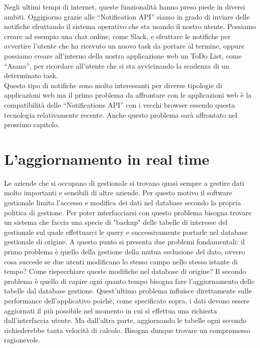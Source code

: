 Negli ultimi tempi di internet, queste funzionalità hanno preso piede in diversi ambiti. Oggigiorno grazie alle “Notification API” siamo in grado di inviare delle notifiche sfruttando il sistema operativo che sta usando il nostro utente. Possiamo creare ad esempio una chat online, come Slack, e sfruttare le notifiche per avvertire l'utente che ha ricevuto un nuovo task da portare al termine, oppure possiamo creare all'interno della nostra applicazione web un ToDo List, come “Asana”, per ricordare all'utente che si sta avvicinando la scadenza di un determinato task.\\
Questo tipo di notifiche sono molto interessanti per diverse tipologie di applicazioni web ma il primo problema da affrontare con le applicazioni web è la compatibilità delle “Notifications API”  con i vecchi  browser essendo questa tecnologia relativamente recente. Anche questo problema sarà affrontato nel prossimo capitolo.


\section{L'aggiornamento in real time}
Le aziende che si occupano di gestionale si trovano quasi sempre a gestire dati molto importanti e sensibili di altre aziende. Per questo motivo il software gestionale limita l'accesso e modifica dei dati nel database secondo la propria politica di gestione. Per poter interfacciarsi con questo problema bisogna trovare un sistema che faccia una specie di "backup" delle tabelle di interesse del gestionale sul quale effettuarci le query e successivamente portarle nel database gestionale di origine. A questo punto si presenta due problemi fondamentali: il primo problema è quello della gestione della mutua esclusione del dato, ovvero cosa succede se due utenti modificano lo stesso campo nello stesso istante di tempo? Come rispecchiare queste modifiche nel database di origine? Il secondo problema è quello di capire ogni quanto tempo bisogna fare l'aggiornamento delle tabelle dal database gestione. Quest'ultimo problema influisce direttamente sulle performance dell'applicativo poichè, come specificato sopra, i dati devono essere aggiornati il più possibile nel momento in cui si effettua una richiesta dall'interfaccia utente. Ma dall'altra parte, aggiornando le tabelle ogni secondo richiederebbe tanta velocità di calcolo. Bisogna dunque trovare un compromesso ragionevole. 

